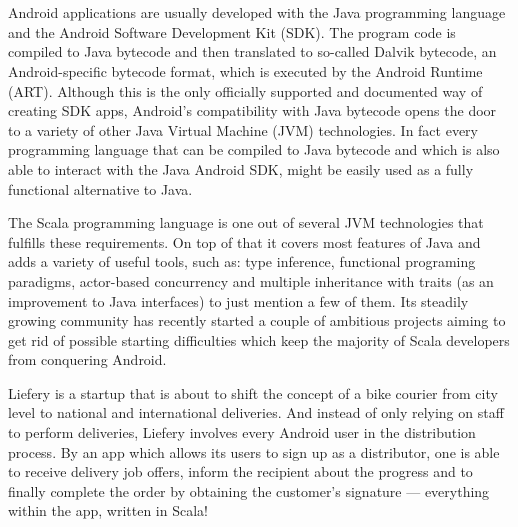 \section*{}

Android applications are usually developed with the Java programming language and the Android Software Development Kit
(SDK). The program code is compiled to Java bytecode and then translated to so-called Dalvik bytecode, an
Android-specific bytecode format, which is executed by the Android Runtime (ART). Although this is the only officially
supported and documented way of creating SDK apps, Android’s compatibility with Java bytecode opens the door to a
variety of other Java Virtual Machine (JVM) technologies. In fact every programming language that can be compiled to
Java bytecode and which is also able to interact with the Java Android SDK, might be easily used as a fully functional
alternative to Java.

The Scala programming language is one out of several JVM technologies that fulfills these requirements. On top of that
it covers most features of Java and adds a variety of useful tools, such as: type inference, functional programing
paradigms, actor-based concurrency and multiple inheritance with traits (as an improvement to Java interfaces) to just
mention a few of them. Its steadily growing community has recently started a couple of ambitious projects aiming to get
rid of possible starting difficulties which keep the majority of Scala developers from conquering Android.

Liefery is a startup that is about to shift the concept of a bike courier from city level to national and international
deliveries. And instead of only relying on staff to perform deliveries, Liefery involves every Android user in the
distribution process. By an app which allows its users to sign up as a distributor, one is able to receive delivery job
offers, inform the recipient about the progress and to finally complete the order by obtaining the customer’s signature
— everything within the app, written in Scala!